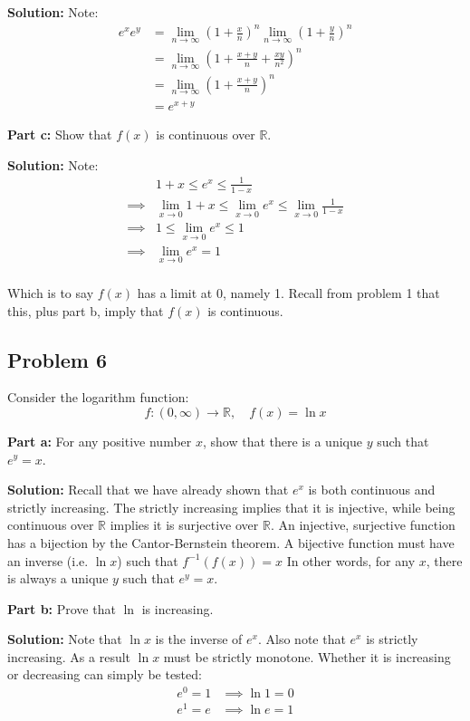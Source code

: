 \documentclass{article}
\newcommand{\R}{\mathbb R}
\begin{document}
\noindent\textbf{Solution:} Note:
\begin{align*}
  e^xe^y&=\lim_{n\to\infty}\left(1+\frac{x}{n}\right)^n\lim_{n\to\infty}\left(1+\frac{y}{n}\right)^n\\
  &=\lim_{n\to\infty}\left(1+\frac{x+y}{n}+\frac{xy}{n^2}\right)^n\\
  &=\lim_{n\to\infty}\left(1+\frac{x+y}{n}\right)^n\\
  &=e^{x+y}
\end{align*}
\bigskip

\noindent\textbf{Part c:} Show that $f(x)$ is continuous over $\R$.
\bigskip

\noindent\textbf{Solution:} Note:
\begin{align*}
  &1+x\le e^x\le\frac{1}{1-x}\\
  \implies&\lim_{x\to0}1+x\le\lim_{x\to0}e^x\le\lim_{x\to0}\frac{1}{1-x}\\
  \implies&1\le\lim_{x\to0}e^x\le1\\
  \implies&\lim_{x\to0}e^x=1\\
\end{align*}

Which is to say $f(x)$ has a limit at 0, namely 1. Recall from problem 1 that this, plus part b, imply that $f(x)$ is continuous.

\subsection*{Problem 6}
Consider the logarithm function:
$$f:(0,\infty)\to\R,\quad f(x)=\ln x$$

\noindent\textbf{Part a:} For any positive number $x$, show that there is a unique $y$ such that $e^y=x$.
\bigskip

\noindent\textbf{Solution:} Recall that we have already shown that $e^x$ is both continuous and strictly increasing. The strictly increasing implies that it is injective, while being continuous over $\R$ implies it is surjective over $\R$. An injective, surjective function has a bijection by the Cantor-Bernstein theorem. A bijective function must have an inverse (i.e. $\ln x$) such that $f^{-1}(f(x))=x$ In other words, for any $x$, there is always a unique $y$ such that $e^y=x$.
\bigskip

\noindent\textbf{Part b:} Prove that $\ln$ is increasing.

\noindent\textbf{Solution:} Note that $\ln x$ is the inverse of $e^x$. Also note that $e^x$ is strictly increasing. As a result $\ln x$ must be strictly monotone. Whether it is increasing or decreasing can simply be tested:
\begin{align*}
  e^0=1&\implies\ln 1=0\\
  e^1=e&\implies\ln e=1
\end{align*}
\end{document}
